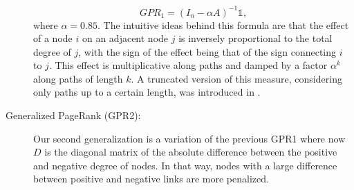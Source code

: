 \begin{description}
\begin{equation}
 GPR_1 = (I_n-\alpha A)^{-1} \mathbb{1},
\end{equation}
where $\alpha = 0.85$. The intuitive ideas behind this formula are that the effect of a node $i$ on an adjacent node $j$ is inversely proportional to the total degree of $j$, with the sign of the effect being that of the sign connecting $i$ to $j$. This effect is multiplicative along paths and damped by a factor $\alpha^k$ along paths of length $k$. A truncated version of this measure, considering only paths up to a certain length, was introduced in \cite{liu2020simple}.
\item[Generalized PageRank (GPR2):] Our second generalization is a variation of the previous GPR1 where now $D$ is the diagonal matrix of the absolute difference between the positive and negative degree of nodes. In that way, nodes with a large difference between positive and negative links are more penalized.
\end{description}
